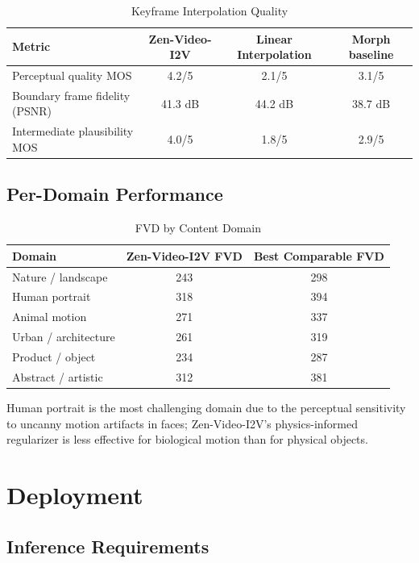 \documentclass[11pt,a4paper]{article}
\begin{document}
\begin{table}[H]
\centering
\caption{Keyframe Interpolation Quality}
\begin{tabular}{lccc}
\toprule
\textbf{Metric} & \textbf{Zen-Video-I2V} & \textbf{Linear Interpolation} & \textbf{Morph baseline} \\
\midrule
Perceptual quality MOS & 4.2/5 & 2.1/5 & 3.1/5 \\
Boundary frame fidelity (PSNR) & 41.3 dB & 44.2 dB & 38.7 dB \\
Intermediate plausibility MOS & 4.0/5 & 1.8/5 & 2.9/5 \\
\bottomrule
\end{tabular}
\end{table}

\subsection{Per-Domain Performance}

\begin{table}[H]
\centering
\caption{FVD by Content Domain}
\begin{tabular}{lcc}
\toprule
\textbf{Domain} & \textbf{Zen-Video-I2V FVD} & \textbf{Best Comparable FVD} \\
\midrule
Nature / landscape & 243 & 298 \\
Human portrait & 318 & 394 \\
Animal motion & 271 & 337 \\
Urban / architecture & 261 & 319 \\
Product / object & 234 & 287 \\
Abstract / artistic & 312 & 381 \\
\bottomrule
\end{tabular}
\end{table}

Human portrait is the most challenging domain due to the perceptual sensitivity to uncanny motion artifacts in faces; Zen-Video-I2V's physics-informed regularizer is less effective for biological motion than for physical objects.

\section{Deployment}

\subsection{Inference Requirements}
\end{document}
